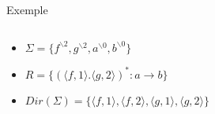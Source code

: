 \documentclass[xcolor={dvipsnames}]{beamer}
\begin{document}
\begin{frame}{Exemple}
  \begin{columns}
    \begin{column}{0.5\textwidth}
      \begin{itemize}
      \item $\Sigma = \{f^{\backslash 2}, g^{\backslash 2}, a^{\backslash 0}, b^{\backslash 0}\}$
      \item $R=\{(\langle f,1 \rangle.\langle g,2 \rangle)^* : a\rightarrow b\}$
      \item $Dir(\Sigma)=\{\langle f,1 \rangle,\langle f,2 \rangle, \langle g,1 \rangle, \langle g,2 \rangle\}$
      \end{itemize}
    \end{column}
    \begin{column}{0.5\textwidth}
\end{column}
\end{columns}
\end{frame}
\end{document}
